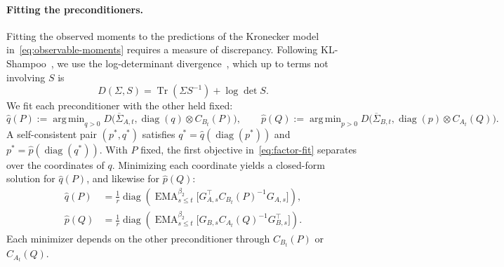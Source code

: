 \documentclass[11pt]{article}
\DeclareMathOperator{\diag}{diag}
\DeclareMathOperator{\Tr}{Tr}
\DeclareMathOperator{\EMA}{EMA}
\DeclareMathOperator*{\argmin}{arg\,min}
\theoremstyle{plain}
\theoremstyle{definition}
\theoremstyle{remark}
\theoremstyle{definition}
\begin{document}
\paragraph{Fitting the preconditioners.} Fitting the observed moments
to the predictions of the Kronecker model
in~\eqref{eq:observable-moments} requires a measure of discrepancy. Following
KL-Shampoo~\cite{klshampoo}, we use the log-determinant
divergence~\cite{logdetdiv}, which up to terms not involving $S$ is
\[
  D(\Sigma,S)=\Tr(\Sigma S^{-1})+\log\det S.
\]
We fit each preconditioner with the other held fixed:
\begin{equation}\label{eq:factor-fit}
  \hat q(P):=\argmin_{q>0}
    D\bigl(\overline \Sigma_{A,t},\diag(q)\otimes C_{B_t}(P)\bigr),
  \qquad
  \hat p(Q):=\argmin_{p>0}
    D\bigl(\overline \Sigma_{B,t},\diag(p)\otimes C_{A_t}(Q)\bigr).
\end{equation}
A self-consistent pair $(p^*,q^*)$ satisfies $q^*=\hat q(\diag(p^*))$ and $p^*=\hat p(\diag(q^*))$. With $P$ fixed, the first objective in~\eqref{eq:factor-fit} separates over the coordinates of $q$. Minimizing each coordinate yields a closed-form solution for $\hat q(P)$, and likewise for $\hat p(Q)$:
\begin{equation}\label{eq:conditional-minimizers}
\begin{aligned}
  \hat q(P)&=\frac1r\diag\left(\EMA^{\beta_2}_{s\le t}\bigl[G_{A,s}^\top C_{B_t}(P)^{-1}G_{A,s}\bigr]\right),\\
  \hat p(Q)&=\frac1r\diag\left(\EMA^{\beta_2}_{s\le t}\bigl[G_{B,s} C_{A_t}(Q)^{-1}G_{B,s}^\top\bigr]\right).
\end{aligned}
\end{equation}
Each minimizer depends on the other preconditioner through
$C_{B_t}(P)$ or $C_{A_t}(Q)$.
\end{document}
